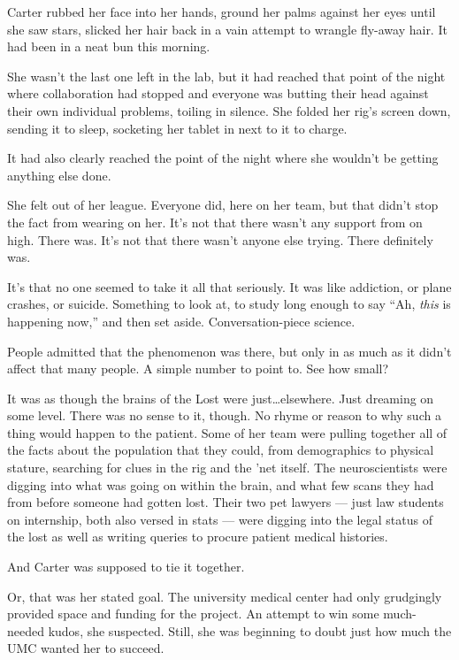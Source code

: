Carter rubbed her face into her hands, ground her palms against her eyes until she saw stars, slicked her hair back in a vain attempt to wrangle fly-away hair. It had been in a neat bun this morning.

She wasn't the last one left in the lab, but it had reached that point of the night where collaboration had stopped and everyone was butting their head against their own individual problems, toiling in silence. She folded her rig's screen down, sending it to sleep, socketing her tablet in next to it to charge.

It had also clearly reached the point of the night where she wouldn't be getting anything else done.

She felt out of her league. Everyone did, here on her team, but that didn't stop the fact from wearing on her. It's not that there wasn't any support from on high. There was. It's not that there wasn't anyone else trying. There definitely was.

It's that no one seemed to take it all that seriously. It was like addiction, or plane crashes, or suicide. Something to look at, to study long enough to say ``Ah, \emph{this} is happening now,'' and then set aside. Conversation-piece science.

People admitted that the phenomenon was there, but only in as much as it didn't affect that many people. A simple number to point to. See how small?

It was as though the brains of the Lost were just\ldots{}elsewhere. Just dreaming on some level. There was no sense to it, though. No rhyme or reason to why such a thing would happen to the patient. Some of her team were pulling together all of the facts about the population that they could, from demographics to physical stature, searching for clues in the rig and the 'net itself. The neuroscientists were digging into what was going on within the brain, and what few scans they had from before someone had gotten lost. Their two pet lawyers --- just law students on internship, both also versed in stats --- were digging into the legal status of the lost as well as writing queries to procure patient medical histories.

And Carter was supposed to tie it together.

Or, that was her stated goal. The university medical center had only grudgingly provided space and funding for the project. An attempt to win some much-needed kudos, she suspected. Still, she was beginning to doubt just how much the UMC wanted her to succeed.

